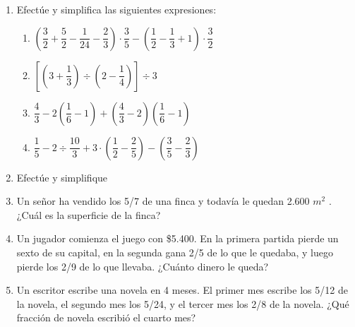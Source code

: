 \documentclass[twoside]{article}
\begin{document}
\begin{enumerate}
\begin{enumerate}
\end{enumerate}
\item Efectúe y simplifica las siguientes expresiones:
\begin{enumerate}
\item $\left(\dfrac{3}{2}+\dfrac{5}{2}-\dfrac{1}{24}-\dfrac{2}{3}\right)\cdot \dfrac{3}{5}-\left(\dfrac{1}{2}-\dfrac{1}{3}+1\right)\cdot \dfrac{3}{2}$
\item $\left[\left(3+\dfrac{1}{3}\right)\div \left(2-\dfrac{1}{4}\right)\right]\div 3$
\item $\dfrac{4}{3}-2\left(\dfrac{1}{6}-1\right)+\left(\dfrac{4}{3}-2\right)\left(\dfrac{1}{6}-1\right)$
\item $\dfrac{1}{5}-2\div \dfrac{10}{3}+3\cdot \left(\dfrac{1}{2}-\dfrac{2}{5}\right)-\left(\dfrac{3}{5}-\dfrac{2}{3}\right)$
\end{enumerate}
\item Efectúe y simplifique
\begin{enumerate}
\end{enumerate}
\item Un señor ha vendido los 5/7 de una finca y todavía le quedan 2.600 $m^{2}$ . ¿Cuál es la superficie de la finca?
\item Un jugador comienza el juego con \$5.400. En la primera partida pierde un sexto de su capital, en la segunda gana 2/5 de lo que le quedaba, y luego pierde los 2/9 de lo que llevaba. ¿Cuánto dinero le queda?
\item Un escritor escribe una novela en 4 meses. El primer mes escribe los 5/12 de la novela, el segundo mes los 5/24, y el tercer mes los 2/8 de la novela. ¿Qué fracción de novela escribió el cuarto mes?

\end{enumerate}
\end{document}

